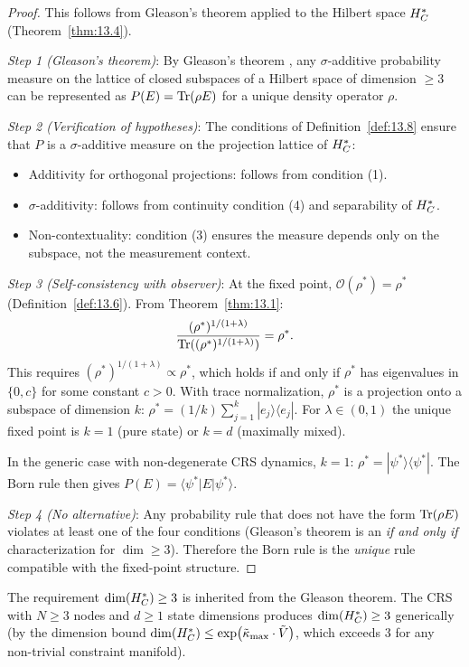 \begin{proof}
This follows from Gleason's theorem applied to the Hilbert space
$H_C^*$ (Theorem~\ref{thm:13.4}).

\emph{Step 1 (Gleason's theorem)}: By Gleason's theorem
\cite{Gleason1957}, any $\sigma$-additive probability measure on the
lattice of closed subspaces of a Hilbert space of dimension $\geq 3$
can be represented as $P(E) = \mathrm{Tr}(\rho E)$ for a unique density
operator $\rho$.

\emph{Step 2 (Verification of hypotheses)}: The conditions of
Definition~\ref{def:13.8} ensure that $P$ is a $\sigma$-additive
measure on the projection lattice of $H_C^*$:
\begin{itemize}
  \item Additivity for orthogonal projections: follows from condition (1).
  \item $\sigma$-additivity: follows from continuity condition (4) and
    separability of $H_C^*$.
  \item Non-contextuality: condition (3) ensures the measure depends
    only on the subspace, not the measurement context.
\end{itemize}

\emph{Step 3 (Self-consistency with observer)}: At the fixed point,
$\mathcal{O}(\rho^*) = \rho^*$ (Definition~\ref{def:13.6}).  From
Theorem~\ref{thm:13.1}:
\[
  \frac{(\rho^*)^{1/(1+\lambda)}}{\mathrm{Tr}((\rho^*)^{1/(1+\lambda)})} = \rho^*.
\]
This requires $(\rho^*)^{1/(1+\lambda)} \propto \rho^*$, which
holds if and only if $\rho^*$ has eigenvalues in $\{0, c\}$ for some
constant $c > 0$.  With trace normalization, $\rho^*$ is a projection
onto a subspace of dimension $k$: $\rho^* = (1/k)\sum_{j=1}^k
|e_j\rangle\langle e_j|$.  For $\lambda \in (0,1)$ the unique
fixed point is $k = 1$ (pure state) or $k = d$ (maximally mixed).

In the generic case with non-degenerate CRS dynamics, $k = 1$:
$\rho^* = |\psi^*\rangle\langle\psi^*|$.  The Born rule then gives
$P(E) = \langle\psi^*|E|\psi^*\rangle$.

\emph{Step 4 (No alternative)}: Any probability rule that does not have
the form $\mathrm{Tr}(\rho E)$ violates at least one of the four conditions
(Gleason's theorem is an \emph{if and only if} characterization for
$\dim \geq 3$).  Therefore the Born rule is the \emph{unique} rule
compatible with the fixed-point structure.
\end{proof}

\begin{remark}
The requirement $\dim(H_C^*) \geq 3$ is inherited from the
Gleason theorem.  The CRS with $N \geq 3$ nodes and $d \geq 1$
state dimensions produces $\dim(H_C^*) \geq 3$ generically
(by the dimension bound $\dim(H_C^*) \leq \exp(\tilde{\kappa}_{\max}
\cdot \tilde{V})$, which exceeds $3$ for any non-trivial constraint
manifold).
\end{remark}

